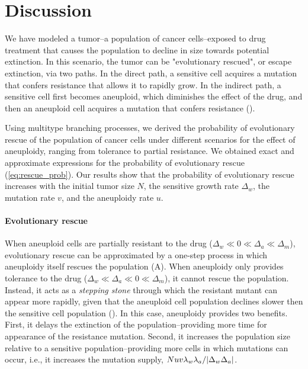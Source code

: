 \documentclass[12pt]{extarticle}
\begin{document}
\section*{Discussion}

We have modeled a tumor--a population of cancer cells--exposed to drug treatment that causes the population to decline in size towards potential extinction.
In this scenario, the tumor can be "evolutionary rescued", or escape extinction, via two paths. In the direct path, a sensitive cell acquires a mutation that confers resistance that allows it to rapidly grow. In the indirect path, a sensitive cell first becomes aneuploid, which diminishes the effect of the drug, and then an aneuploid cell acquires a mutation that confers resistance ().

Using multitype branching processes, we derived the probability of evolutionary rescue of the population of cancer cells under different scenarios for the effect of aneuploidy, ranging from tolerance to partial resistance.
We obtained exact and approximate expressions for the probability of evolutionary rescue (\cref{eq:rescue_prob}). 
Our results show that the probability of evolutionary rescue increases with the initial tumor size $N$, the sensitive growth rate $\Delta_w$, the mutation rate $v$, and the aneuploidy rate $u$.

\paragraph{Evolutionary rescue}
When aneuploid cells are partially resistant to the drug ($\Delta_w\ll0\ll\Delta_a\ll\Delta_m$), evolutionary rescue can be approximated by a one-step process in which aneuploidy itself rescues the population (A). 
When aneuploidy only provides tolerance to the drug ($\Delta_w\ll\Delta_a\ll0\ll\Delta_m$), it cannot rescue the population.
Instead, it acts as a \emph{stepping stone} through which the resistant mutant can appear more rapidly, given that the aneuploid cell population declines slower then the sensitive cell population (). In this case, aneuploidy provides two benefits. First, it delays the extinction of the population--providing more time for appearance of the resistance mutation. Second, it increases the population size relative to a sensitive population--providing more cells in which mutations can occur, i.e., it increases the mutation supply, $Nuv\lambda_w\lambda_a/\abs{\Delta_w\Delta_a}$.
\end{document}
